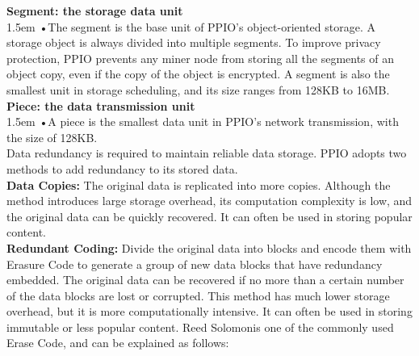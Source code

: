 \documentclass[10pt,a4paper]{article}
\begin{document}
\noindent   
{\bf Segment: the storage data unit}
\vspace{-0.8em}
\\

\hangindent 1.5em
\noindent   
•\quad The segment is the base unit of PPIO’s object-oriented storage. A storage object is always divided into multiple segments. To improve privacy protection, PPIO prevents any miner node from storing all the segments of an object copy, even if the copy of the object is encrypted. A segment is also the smallest unit in storage scheduling, and its size ranges from 128KB to 16MB.
\vspace{-0.6em}
\\

\noindent   
{\bf Piece: the data transmission unit}
\vspace{-0.6em}
\\

\hangindent 1.5em
\noindent   
•\quad  A piece is the smallest data unit in PPIO’s network transmission, with the size of 128KB.
\vspace{-0.5em}
\\

\noindent  
Data redundancy is required to maintain reliable data storage. PPIO adopts two methods to add redundancy to its stored data.
\vspace{-0.6em}
\\

\noindent   
 {\bf Data Copies:} The original data is replicated into more copies. Although the method introduces large storage overhead, its computation complexity is low, and the original data can be quickly recovered. It can often be used in storing popular content.
 \vspace{-0.5em}
\\

\noindent   
{\bf Redundant Coding:} Divide the original data into blocks and encode them with Erasure Code to generate a group of new data blocks that have redundancy embedded. The original data can be recovered if no more than a certain number of the data blocks are lost or corrupted. This method has much lower storage overhead, but it is more computationally intensive. It can often be used in storing immutable or less popular content. Reed Solomon\cite{article22}is one of the commonly used Erase Code, and can be explained as follows:
\vspace{-0.8em}
\\
\end{document}

